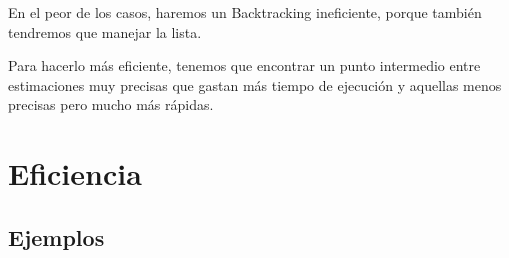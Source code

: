 \documentclass[10pt,a4paper,spanish]{report}
\theoremstyle{definition}
\theoremstyle{remark}
\begin{document}
En el peor de los casos, haremos un Backtracking ineficiente, porque también tendremos que manejar la lista.

Para hacerlo más eficiente, tenemos que encontrar un punto intermedio entre estimaciones muy precisas que gastan más tiempo de ejecución y aquellas menos precisas pero mucho más rápidas.




































































\appendix
\clearpage
\addappheadtotoc
\appendixpage
\chapter{\textcolor[rgb]{0.1,0.2,1}Eficiencia}
\label{eficiencia}

\section{\textcolor[rgb]{0.1,0.2,1}Ejemplos}
\end{document}
